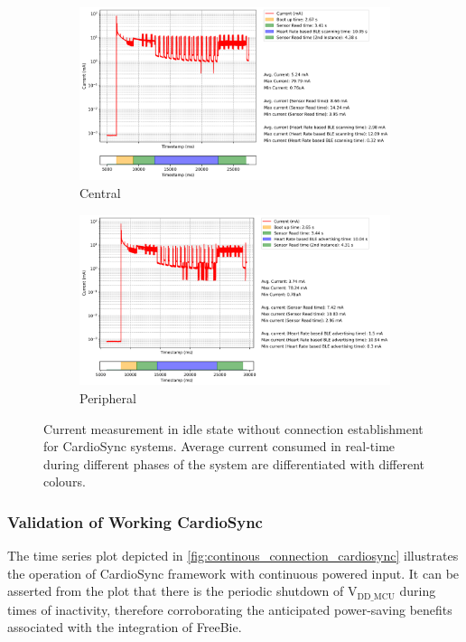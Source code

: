 \begin{figure}[ht]
    \centering
    \begin{subfigure}{0.85\linewidth}        
        \centering
        \includegraphics[width=\linewidth]{chapters/Results/Current vs Timestamp - CardioSync Central.png}
        \caption{Central}
        \label{fig:current_cardiosync_central}
    \end{subfigure}
    \begin{subfigure}{0.85\linewidth}    
        \centering
        \includegraphics[width=\linewidth]{chapters/Results/Current vs Timestamp - CardioSync Peripheral.png}
        \caption{Peripheral}
        \label{fig:current_cardiosync_peripheral}
    \end{subfigure}
    \caption{Current measurement in idle state without connection establishment for CardioSync systems. Average current consumed in real-time during different phases of the system are differentiated with different colours.}
    \label{fig:current_cardiosync}
\end{figure}

\subsubsection{Validation of Working CardioSync}
The time series plot depicted in \autoref{fig:continous_connection_cardiosync} illustrates the operation of CardioSync framework with continuous powered input. It can be asserted from the plot that there is the periodic shutdown of \(\text{V}_\text{DD\_MCU}\) during times of inactivity, therefore corroborating the anticipated power-saving benefits associated with the integration of FreeBie.
\vspace{1\baselineskip}

